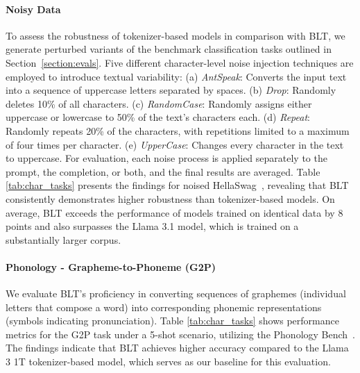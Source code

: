 \paragraph{Noisy Data} To assess the robustness of tokenizer-based models in comparison with {\textsc BLT}, we generate perturbed variants of the benchmark classification tasks outlined in Section~\ref{section:evals}. Five different character-level noise injection techniques are employed to introduce textual variability: (a) \textit{AntSpeak}: Converts the input text into a sequence of uppercase letters separated by spaces. (b) \textit{Drop}: Randomly deletes 10\% of all characters. (c) \textit{RandomCase}: Randomly assigns either uppercase or lowercase to 50\% of the text's characters each. (d) \textit{Repeat}: Randomly repeats 20\% of the characters, with repetitions limited to a maximum of four times per character. (e) \textit{UpperCase}: Changes every character in the text to uppercase. For evaluation, each noise process is applied separately to the prompt, the completion, or both, and the final results are averaged. Table \ref{tab:char_tasks} presents the findings for noised HellaSwag~\citep{Eval_hellaswag}, revealing that {\textsc BLT} consistently demonstrates higher robustness than tokenizer-based models. On average, {\textsc BLT} exceeds the performance of models trained on identical data by 8 points and also surpasses the Llama 3.1 model, which is trained on a substantially larger corpus.

\paragraph{Phonology - Grapheme-to-Phoneme (G2P)} We evaluate {\textsc BLT}'s proficiency in converting sequences of graphemes (individual letters that compose a word) into corresponding phonemic representations (symbols indicating pronunciation). Table \ref{tab:char_tasks} shows performance metrics for the G2P task under a 5-shot scenario, utilizing the Phonology Bench~\citep{suvarna2024phonologybench}. The findings indicate that {\textsc BLT} achieves higher accuracy compared to the Llama 3 1T tokenizer-based model, which serves as our baseline for this evaluation.


